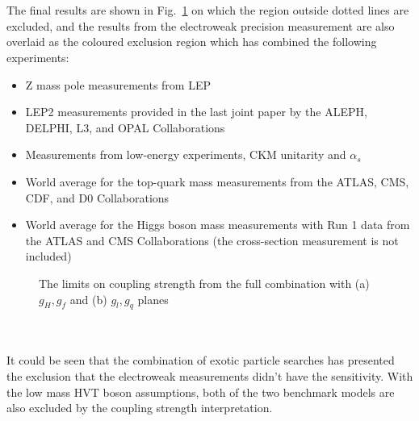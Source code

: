 \\
\\The final results are shown in Fig.~\ref{Fig:limit_coupling} on which the region outside dotted lines are excluded, and the results from the electroweak precision measurement \cite{delAguila:2010mx} are also overlaid as the coloured exclusion region which has combined the following experiments:
\begin{itemize}
	\item Z mass pole measurements from LEP\cite{delAguila:2010mx}
	\item LEP2 measurements provided in the last joint paper by the ALEPH, DELPHI, L3, and OPAL Collaborations\cite{Schael:2013ita}
	\item Measurements from low-energy experiments, CKM unitarity and $\alpha_{s}$\cite{Olive_2016}
	\item World average for the top-quark mass measurements from the ATLAS, CMS, CDF, and D0 Collaborations\cite{ATLAS:2014wva}
	\item World average for the Higgs boson mass measurements with Run 1 data from the ATLAS and CMS Collaborations (the cross-section measurement is not included)\cite{Aad:2015zhl}
\end{itemize}   
\begin{figure}[ht]
	\centering
	\caption{The limits on coupling strength from the full combination with (a) {$g_H, g_f$} and (b) {$g_l, g_q$} planes }
	\label{Fig:limit_coupling}
\end{figure}
\noindent
\\
\\It could be seen that the combination of exotic particle searches has presented the exclusion that the electroweak measurements didn't have the sensitivity. With the low mass HVT boson assumptions, both of the two benchmark models are also excluded by the coupling strength interpretation.  